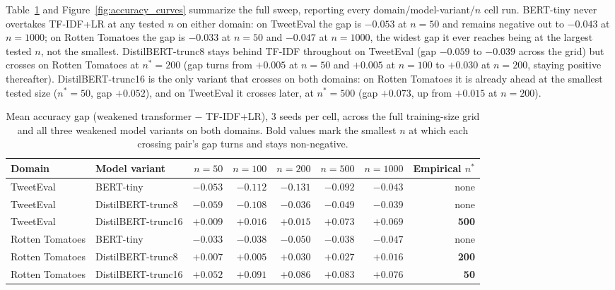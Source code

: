 \documentclass[11pt,letterpaper]{article}
\begin{document}
Table~\ref{tab:sweep} and Figure~\ref{fig:accuracy_curves} summarize the full sweep, reporting every domain/model-variant/$n$ cell run. BERT-tiny never overtakes TF-IDF+LR at any tested $n$ on either domain: on TweetEval the gap is $-0.053$ at $n{=}50$ and remains negative out to $-0.043$ at $n{=}1000$; on Rotten Tomatoes the gap is $-0.033$ at $n{=}50$ and $-0.047$ at $n{=}1000$, the widest gap it ever reaches being at the largest tested $n$, not the smallest. DistilBERT-trunc8 stays behind TF-IDF throughout on TweetEval (gap $-0.059$ to $-0.039$ across the grid) but crosses on Rotten Tomatoes at $n^*{=}200$ (gap turns from $+0.005$ at $n{=}50$ and $+0.005$ at $n{=}100$ to $+0.030$ at $n{=}200$, staying positive thereafter). DistilBERT-trunc16 is the only variant that crosses on both domains: on Rotten Tomatoes it is already ahead at the smallest tested size ($n^*{=}50$, gap $+0.052$), and on TweetEval it crosses later, at $n^*{=}500$ (gap $+0.073$, up from $+0.015$ at $n{=}200$).

\begin{table}[!htbp]
\centering
\small
\begin{tabular}{llrrrrrr}
\toprule
Domain & Model variant & $n{=}50$ & $n{=}100$ & $n{=}200$ & $n{=}500$ & $n{=}1000$ & Empirical $n^*$ \\
\midrule
TweetEval & BERT-tiny & $-0.053$ & $-0.112$ & $-0.131$ & $-0.092$ & $-0.043$ & none \\
TweetEval & DistilBERT-trunc8 & $-0.059$ & $-0.108$ & $-0.036$ & $-0.049$ & $-0.039$ & none \\
TweetEval & DistilBERT-trunc16 & $+0.009$ & $+0.016$ & $+0.015$ & $+0.073$ & $+0.069$ & \textbf{500} \\
Rotten Tomatoes & BERT-tiny & $-0.033$ & $-0.038$ & $-0.050$ & $-0.038$ & $-0.047$ & none \\
Rotten Tomatoes & DistilBERT-trunc8 & $+0.007$ & $+0.005$ & $+0.030$ & $+0.027$ & $+0.016$ & \textbf{200} \\
Rotten Tomatoes & DistilBERT-trunc16 & $+0.052$ & $+0.091$ & $+0.086$ & $+0.083$ & $+0.076$ & \textbf{50} \\
\bottomrule
\end{tabular}
\caption{Mean accuracy gap (weakened transformer $-$ TF-IDF+LR), 3 seeds per cell, across the full training-size grid and all three weakened model variants on both domains. Bold values mark the smallest $n$ at which each crossing pair's gap turns and stays non-negative.}
\label{tab:sweep}
\end{table}
\end{document}
